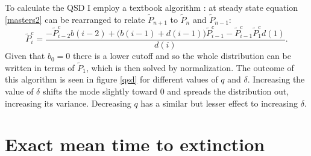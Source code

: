 To calculate the QSD I employ a textbook algorithm \cite{Nisbet1982}: at steady state equation \ref{masters2} can be rearranged to relate $\tilde{P}_{n+1}$ to $\tilde{P}_n$ and $\tilde{P}_{n-1}$:
\begin{equation}
\widetilde{P}^c_{i} = \frac{- \widetilde{P}^c_{i-2}b(i-2) 
	+ \big(b(i-1)+d(i-1)\big)\widetilde{P}^c_{i-1} 
	- \widetilde{P}^c_{i-1}\widetilde{P}^c_{1}d(1)}{d(i)}.
\end{equation}
Given that $b_0=0$ there is a lower cutoff and so the whole distribution can be written in terms of $\tilde{P}_1$, which is then solved by normalization. 
The outcome of this algorithm is seen in figure \ref{qsd} for different values of $q$ and $\delta$. 
Increasing the value of $\delta$ shifts the mode slightly toward $0$ and spreads the distribution out, increasing its variance. 
Decreasing $q$ has a similar but lesser effect to increasing $\delta$. %


\section{Exact mean time to extinction}%

